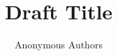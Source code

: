 \documentclass[review=false,nonacm]{acmart}
\title{Draft Title}
\author{Anonymous Authors}
\begin{document}
\begin{abstract}
%
\end{abstract}


\begin{titlepage}

\maketitle

\end{titlepage}



\end{document}
